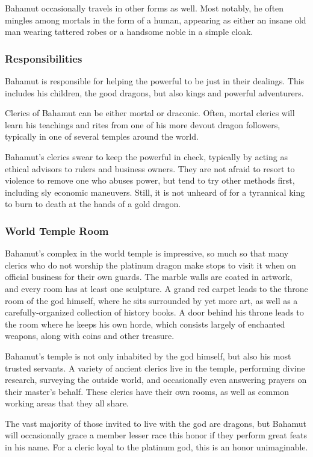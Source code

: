 Bahamut occasionally travels in other forms as well.
Most notably, he often mingles among mortals in the form of a human, appearing as either an insane old man wearing tattered robes or a handsome noble in a simple cloak.

\subsubsection*{Responsibilities}
Bahamut is responsible for helping the powerful to be just in their dealings.
This includes his children, the good dragons, but also kings and powerful adventurers.

Clerics of Bahamut can be either mortal or draconic.
Often, mortal clerics will learn his teachings and rites from one of his more devout dragon followers, typically in one of several temples around the world.


Bahamut's clerics swear to keep the powerful in check, typically by acting as ethical advisors to rulers and business owners.
They are not afraid to resort to violence to remove one who abuses power, but tend to try other methods first, including sly economic maneuvers. 
Still, it is not unheard of for a tyrannical king to burn to death at the hands of a gold dragon. 

\subsubsection*{World Temple Room}
Bahamut's complex in the world temple is impressive, so much so that many clerics who do not worship the platinum dragon make stops to visit it when on official business for their own guards.
The marble walls are coated in artwork, and every room has at least one sculpture.
A grand red carpet leads to the throne room of the god himself, where he sits surrounded by yet more art, as well as a carefully-organized collection of history books.
A door behind his throne leads to the room where he keeps his own horde, which consists largely of enchanted weapons, along with coins and other treasure.

Bahamut's temple is not only inhabited by the god himself, but also his most trusted servants.
A variety of ancient clerics live in the temple, performing divine research, surveying the outside world, and occasionally even answering prayers on their master's behalf.
These clerics have their own rooms, as well as common working areas that they all share.

The vast majority of those invited to live with the god are dragons, but Bahamut will occasionally grace a member lesser race this honor if they perform great feats in his name.
For a cleric loyal to the platinum god, this is an honor unimaginable.

